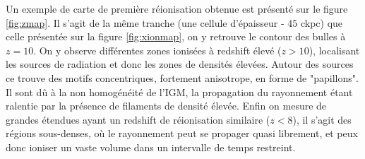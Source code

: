 
Un exemple de carte de première réionisation obtenue est présenté sur le figure \ref{fig:zmap}.
Il s'agit de la même tranche (une cellule d’épaisseur - $45$ ckpc) que celle présentée sur la figure \ref{fig:xionmap}, on y retrouve le contour des bulles à $z=10$.
On y observe différentes zones ionisées à redshift élevé ($z>10$), localisant les sources de radiation et donc les zones de densités élevées.
Autour des sources ce trouve des motifs concentriques, fortement anisotrope, en forme de "papillons".
Il sont dû à la non homogénéité de l'\ac{IGM}, la propagation du rayonnement étant ralentie par la présence de filaments de densité élevée.
Enfin on mesure de grandes étendues ayant un redshift de réionisation similaire ($z<8$), il s'agit des régions sous-denses, où le rayonnement peut se propager quasi librement, et peux donc ioniser un vaste volume dans un intervalle de temps restreint.

